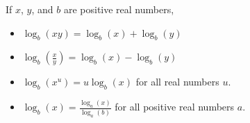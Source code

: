 \documentclass[nooutcomes]{ximera}
\begin{document}
\begin{summary}

If $x$, $y$, and $b$ are positive real numbers,\begin{itemize}
\item $\log_b(xy) = \log_b(x) + \log_b(y)$
\item $\log_b\left(\frac{x}{y}\right) = \log_b(x) - \log_b(y)$
\item $\log_b(x^u) = u\log_b(x)$ for all real numbers $u$. 
\item  $\log_b(x) = \frac{\log_a(x)}{\log_a(b)}$ for all positive real numbers $a$. 
\end{itemize}\end{summary}
\end{document}
